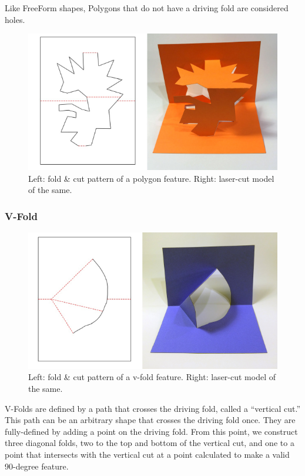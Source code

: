 Like FreeForm shapes, Polygons that do not have a driving fold are
considered holes.

\begin{figure}[htbp]
\centering
\includegraphics{figures/33_UI_Interface_Data_Structures/poly.pdf}
\caption{Left: fold \& cut pattern of a polygon feature. Right:
laser-cut model of the same.}
\end{figure}

\subsubsection{V-Fold}\label{v-fold}

\begin{figure}[htbp]
\centering
\includegraphics{figures/33_UI_Interface_Data_Structures/v.pdf}
\caption{Left: fold \& cut pattern of a v-fold feature. Right: laser-cut
model of the same.}
\end{figure}

V-Folds are defined by a path that crosses the driving fold, called a
``vertical cut.'' This path can be an arbitrary shape that crosses the
driving fold once. They are fully-defined by adding a point on the
driving fold. From this point, we construct three diagonal folds, two to
the top and bottom of the vertical cut, and one to a point that
intersects with the vertical cut at a point calculated to make a valid
90-degree feature.

